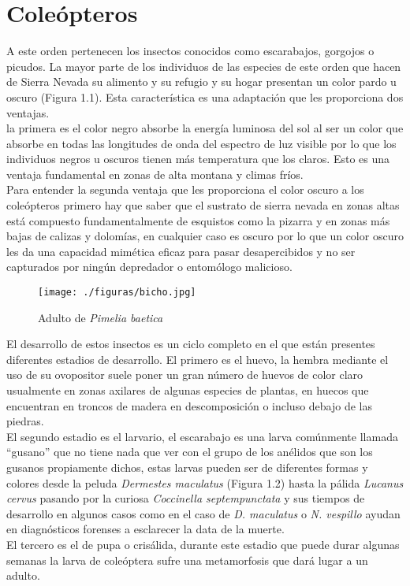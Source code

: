 \documentclass[a4paper,openright,12pt]{book}
\begin{document}
\chapter{Cole\'{o}pteros}
A este orden pertenecen los insectos conocidos como escarabajos, gorgojos o picudos. La mayor parte de los individuos de las especies de este orden que hacen de Sierra Nevada su alimento y su refugio y su hogar presentan un color pardo u oscuro (Figura 1.1). Esta caracter\'{i}stica es una adaptaci\'{o}n que les proporciona dos ventajas.\\ la primera es el color negro absorbe la energ\'{i}a luminosa del sol al ser un color que absorbe en todas las longitudes de onda del espectro de luz visible por lo que los individuos negros u oscuros tienen m\'{a}s temperatura que los claros. Esto es una ventaja fundamental en zonas de alta montana y climas fr\'{i}os. \\ Para entender la segunda ventaja que les proporciona el color oscuro a los cole\'{o}pteros primero hay que saber que el sustrato de sierra nevada en zonas altas est\'{a} compuesto fundamentalmente de esquistos como la pizarra y en zonas m\'{a}s bajas de calizas y dolom\'{i}as, en cualquier caso es oscuro por lo que un color oscuro les da una capacidad mim\'{e}tica eficaz para pasar desapercibidos y no ser capturados por ning\'{u}n depredador o entom\'{o}logo malicioso. \\
\begin{figure}
\begin{center}
\texttt{[image: ./figuras/bicho.jpg]}
\caption{\footnotesize Adulto de \textit{Pimelia baetica}}
\label{figura 1.1}
\end{center}
\end{figure}
El desarrollo de estos insectos es un ciclo completo en el que están presentes diferentes estadios de desarrollo. El primero es el huevo, la hembra mediante el uso de su ovopositor suele poner un gran n\'{u}mero de huevos de color claro usualmente en zonas axilares de algunas especies de plantas, en huecos que encuentran en troncos de madera en descomposici\'{o}n o incluso debajo de las piedras.\\ El segundo estadio es el larvario, el escarabajo es una larva comúnmente llamada ``gusano'' que no tiene nada que ver con el grupo de los an\'{e}lidos que son los gusanos propiamente dichos, estas larvas pueden ser de diferentes formas y colores desde la peluda \textit{Dermestes maculatus} (Figura 1.2) hasta la p\'{a}lida \textit{Lucanus cervus} pasando por la curiosa \textit{Coccinella septempunctata} y sus tiempos de desarrollo en algunos casos como en el caso de \textit{D. maculatus} o \textit{N. vespillo} ayudan en diagn\'{o}sticos forenses a esclarecer la data de la muerte. \\ El tercero es el de pupa o cris\'{a}lida, durante este estadio que puede durar algunas semanas la larva de cole\'{o}ptera sufre una metamorfosis que dar\'{a} lugar a un adulto.
\end{document}
